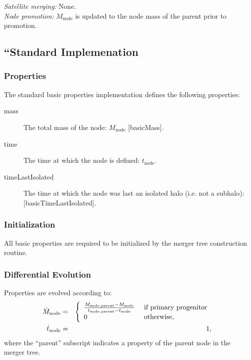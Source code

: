 \noindent\emph{Satellite merging:} None.\\

\noindent\emph{Node promotion:} $M_\mathrm{node}$ is updated to the \gls{node} mass of the parent prior to promotion.\\

\subsection{``Standard Implemenation}

\subsubsection{Properties}

The standard basic properties implementation defines the following properties:
\begin{description}
 \item [{\normalfont \ttfamily mass}] The total mass of the node: $M_\mathrm{node}$ [{\normalfont \ttfamily basicMass}].
 \item [{\normalfont \ttfamily time}] The time at which the \gls{node} is defined: $t_\mathrm{node}$.
 \item [{\normalfont \ttfamily timeLastIsolated}] The time at which the \gls{node} was last an isolated halo (i.e. not a subhalo): [\normalfont \ttfamily basicTimeLastIsolated].
\end{description}

\subsubsection{Initialization}

All basic properties are required to be initialized by the merger tree construction routine.

\subsubsection{Differential Evolution}

Properties are evolved according to:
\begin{eqnarray}
 \dot{M}_\mathrm{node} &=& \left\{\begin{array}{ll}{M_\mathrm{node, parent} - M_\mathrm{node} \over t_\mathrm{node, parent} - t_\mathrm{node}} & \hbox{ if primary progenitor} \\ 0 & \hbox{ otherwise}, \end{array} \right. \\
 \dot{t}_\mathrm{node} &=& 1,
\end{eqnarray}
where the ``parent'' subscript indicates a property of the parent \gls{node} in the merger tree.

